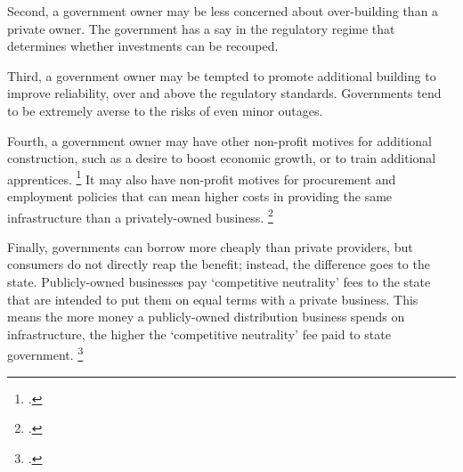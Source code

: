 \documentclass[FrontPage]{grattan}
\begin{document}
Second, a government owner may be less concerned about over-building than a private owner. The government has a say in the regulatory regime that determines whether investments can be recouped. 

Third, a government owner may be tempted to promote additional building to improve reliability, over and above the regulatory standards. Governments tend to be extremely averse to the risks of even minor outages.

Fourth, a government owner may have other non-profit motives for additional construction, such as a desire to boost economic growth, or to train additional apprentices.%
\footcites{WoodHunterOTooleEtAl2012}{Mountain2017PhD}
It may also have non-profit motives for procurement and employment policies that can mean higher costs in providing the same infrastructure than a privately-owned business.
\footcite{PC2013ElectricityInquiry}

Finally, governments can borrow more cheaply than private providers, but consumers do not directly reap the benefit; instead, the difference goes to the state. Publicly-owned businesses pay `competitive neutrality' fees to the state that are intended to put them on equal terms with a private business. This means the more money a publicly-owned distribution business spends on infrastructure, the higher the `competitive neutrality' fee paid to state government.%
\footcite{WoodHunterOTooleEtAl2012}


 
\end{document}
